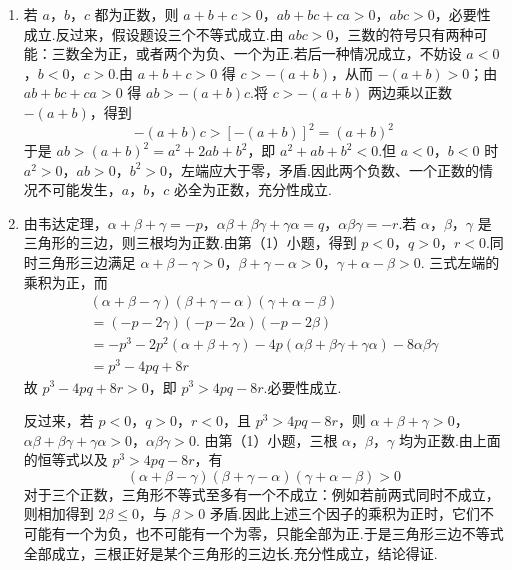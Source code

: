 \begin{solution}
\begin{enumerate}
\item 若 \(a\)，\(b\)，\(c\) 都为正数，则 \(a+b+c>0\)，\(ab+bc+ca>0\)，\(abc>0\)，必要性成立.反过来，假设题设三个不等式成立.由 \(abc>0\)，三数的符号只有两种可能：三数全为正，或者两个为负、一个为正.若后一种情况成立，不妨设 \(a<0\)，\(b<0\)，\(c>0\).由 \(a+b+c>0\) 得 \(c>-(a+b)\)，从而 \(-(a+b)>0\)；由 \(ab+bc+ca>0\) 得 \(ab>-(a+b)c\).将 \(c>-(a+b)\) 两边乘以正数 \(-(a+b)\)，得到
\[
-(a+b)c>[-(a+b)]^2=(a+b)^2
\]
于是 \(ab>(a+b)^2=a^2+2ab+b^2\)，即 \(a^2+ab+b^2<0\).但 \(a<0\)，\(b<0\) 时 \(a^2>0\)，\(ab>0\)，\(b^2>0\)，左端应大于零，矛盾.因此两个负数、一个正数的情况不可能发生，\(a\)，\(b\)，\(c\) 必全为正数，充分性成立.

\item 由韦达定理，\(\alpha+\beta+\gamma=-p\)，\(\alpha\beta+\beta\gamma+\gamma\alpha=q\)，\(\alpha\beta\gamma=-r\).若 \(\alpha\)，\(\beta\)，\(\gamma\) 是三角形的三边，则三根均为正数.由第（1）小题，得到 \(p<0\)，\(q>0\)，\(r<0\).同时三角形三边满足 \(\alpha+\beta-\gamma>0\)，\(\beta+\gamma-\alpha>0\)，\(\gamma+\alpha-\beta>0\).
三式左端的乘积为正，而
\[
\begin{gathered}
(\alpha+\beta-\gamma)(\beta+\gamma-\alpha)(\gamma+\alpha-\beta)\\
=(-p-2\gamma)(-p-2\alpha)(-p-2\beta)\\
=-p^3-2p^2(\alpha+\beta+\gamma)-4p(\alpha\beta+\beta\gamma+\gamma\alpha)-8\alpha\beta\gamma\\
=p^3-4pq+8r
\end{gathered}
\]
故 \(p^3-4pq+8r>0\)，即 \(p^3>4pq-8r\).必要性成立.

反过来，若 \(p<0\)，\(q>0\)，\(r<0\)，且 \(p^3>4pq-8r\)，则
\(\alpha+\beta+\gamma>0\)，\(\alpha\beta+\beta\gamma+\gamma\alpha>0\)，\(\alpha\beta\gamma>0\).
由第（1）小题，三根 \(\alpha\)，\(\beta\)，\(\gamma\) 均为正数.由上面的恒等式以及 \(p^3>4pq-8r\)，有
\[
(\alpha+\beta-\gamma)(\beta+\gamma-\alpha)(\gamma+\alpha-\beta)>0
\]
对于三个正数，三角形不等式至多有一个不成立：例如若前两式同时不成立，则相加得到 \(2\beta\leq0\)，与 \(\beta>0\) 矛盾.因此上述三个因子的乘积为正时，它们不可能有一个为负，也不可能有一个为零，只能全部为正.于是三角形三边不等式全部成立，三根正好是某个三角形的三边长.充分性成立，结论得证.
\end{enumerate}
\end{solution}
